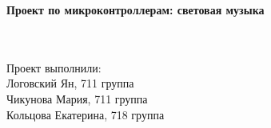 \documentclass[a4paper,12pt]{article}
\begin{document}

\vfill

{ \LARGE \textbf{ Проект по микроконтроллерам: световая музыка}}\\\\\\

\begin{figure}[h]
\end{figure}

\vfill

\hspace*{\fill}  Проект выполнили:\\
\hspace*{\fill}  Логовский Ян, 711 группа\\
\hspace*{\fill}  Чикунова Мария, 711 группа\\
\hspace*{\fill}  Кольцова Екатерина, 718 группа\\

\newpage
\end{document}
